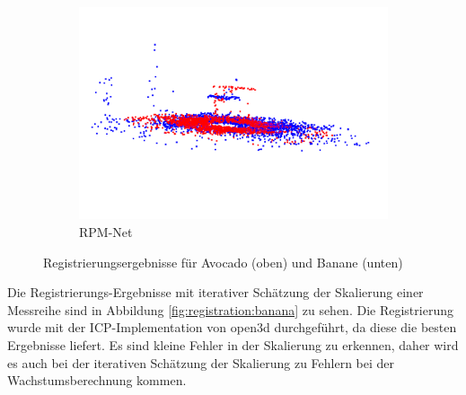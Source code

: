 \documentclass[12pt,titlepage, twoside]{article}
\begin{document}
\begin{figure}[htb]
\begin{subfigure}{0.19\textwidth}
    \includegraphics[width=\linewidth]{./Images/registration_rpm_banana.png}
    \caption{RPM-Net}
    \label{fig:registration:compare:10}
\end{subfigure}
\caption{Registrierungsergebnisse für Avocado (oben) und Banane (unten)}
\label{fig:registration:compare}
\end{figure}

Die Registrierungs-Ergebnisse mit iterativer Schätzung der Skalierung einer Messreihe sind in Abbildung \ref{fig:registration:banana} zu sehen. 
Die Registrierung wurde mit der ICP-Implementation von open3d durchgeführt, da diese die besten Ergebnisse liefert.
Es sind kleine Fehler in der Skalierung zu erkennen, daher wird es auch bei der iterativen Schätzung der Skalierung zu Fehlern bei der Wachstumsberechnung kommen. 
\end{document}
